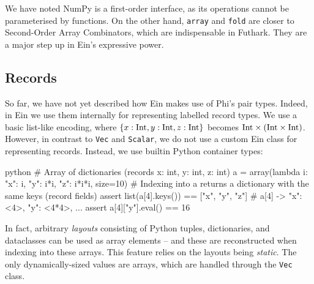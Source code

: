 We have noted NumPy is a first-order interface, as its operations cannot be parameterised by functions. On the other hand, \texttt{array} and \texttt{fold} are closer to Second-Order Array Combinators, which are indispensable in Futhark. They are a major step up in Ein's expressive power.

\subsection{Records}

So far, we have not yet described how Ein makes use of Phi's pair types. Indeed, in Ein we use them internally for representing labelled record types. We use a basic list-like encoding, where $\{ x: \mathrm{Int}, y: \mathrm{Int}, z: \mathrm{Int} \}$ becomes $\phipairtype{\phiinttype}{\left( \phiinttype \times \phiinttype \right)}$. However, in contrast to \texttt{Vec} and \texttt{Scalar}, we do not use a custom Ein class for representing records. Instead, we use builtin Python container types:
\begin{center} 
\begin{cminted}{python}
# Array of dictionaries (records {x: int, y: int, z: int})
a = array(lambda i: {"x": i, "y": i*i, "z": i*i*i}, size=10)
# Indexing into a returns a dictionary with the same keys (record fields)
assert list(a[4].keys()) == ["x", "y", "z"]
# a[4] -> {"x": <4>, "y": <4*4>, ...}
assert a[4]["y"].eval() == 16
\end{cminted}
\end{center}
In fact, arbitrary \textit{layouts} consisting of Python tuples, dictionaries, and dataclasses can be used as array elements -- and these are reconstructed when indexing into these arrays. This feature relies on the layouts being \textit{static}. The only dynamically-sized values are arrays, which are handled through the \texttt{Vec} class. 

